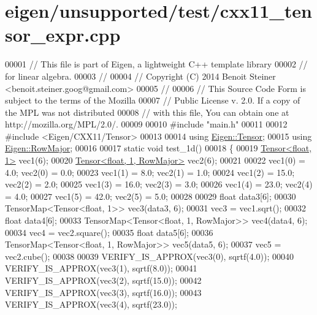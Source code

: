 \hypertarget{eigen_2unsupported_2test_2cxx11__tensor__expr_8cpp_source}{}\section{eigen/unsupported/test/cxx11\+\_\+tensor\+\_\+expr.cpp}
\label{eigen_2unsupported_2test_2cxx11__tensor__expr_8cpp_source}

\begin{DoxyCode}
00001 \textcolor{comment}{// This file is part of Eigen, a lightweight C++ template library}
00002 \textcolor{comment}{// for linear algebra.}
00003 \textcolor{comment}{//}
00004 \textcolor{comment}{// Copyright (C) 2014 Benoit Steiner <benoit.steiner.goog@gmail.com>}
00005 \textcolor{comment}{//}
00006 \textcolor{comment}{// This Source Code Form is subject to the terms of the Mozilla}
00007 \textcolor{comment}{// Public License v. 2.0. If a copy of the MPL was not distributed}
00008 \textcolor{comment}{// with this file, You can obtain one at http://mozilla.org/MPL/2.0/.}
00009 
00010 \textcolor{preprocessor}{#include "main.h"}
00011 
00012 \textcolor{preprocessor}{#include <Eigen/CXX11/Tensor>}
00013 
00014 \textcolor{keyword}{using} \hyperlink{class_eigen_1_1_tensor}{Eigen::Tensor};
00015 \textcolor{keyword}{using} \hyperlink{group__enums_ggaacded1a18ae58b0f554751f6cdf9eb13acfcde9cd8677c5f7caf6bd603666aae3}{Eigen::RowMajor};
00016 
00017 \textcolor{keyword}{static} \textcolor{keywordtype}{void} test\_1d()
00018 \{
00019   \hyperlink{class_eigen_1_1_tensor}{Tensor<float, 1>} vec1(6);
00020   \hyperlink{class_eigen_1_1_tensor}{Tensor<float, 1, RowMajor>} vec2(6);
00021 
00022   vec1(0) = 4.0;  vec2(0) = 0.0;
00023   vec1(1) = 8.0;  vec2(1) = 1.0;
00024   vec1(2) = 15.0; vec2(2) = 2.0;
00025   vec1(3) = 16.0; vec2(3) = 3.0;
00026   vec1(4) = 23.0; vec2(4) = 4.0;
00027   vec1(5) = 42.0; vec2(5) = 5.0;
00028 
00029   \textcolor{keywordtype}{float} data3[6];
00030   TensorMap<Tensor<float, 1>> vec3(data3, 6);
00031   vec3 = vec1.sqrt();
00032   \textcolor{keywordtype}{float} data4[6];
00033   TensorMap<Tensor<float, 1, RowMajor>> vec4(data4, 6);
00034   vec4 = vec2.square();
00035   \textcolor{keywordtype}{float} data5[6];
00036   TensorMap<Tensor<float, 1, RowMajor>> vec5(data5, 6);
00037   vec5 = vec2.cube();
00038 
00039   VERIFY\_IS\_APPROX(vec3(0), sqrtf(4.0));
00040   VERIFY\_IS\_APPROX(vec3(1), sqrtf(8.0));
00041   VERIFY\_IS\_APPROX(vec3(2), sqrtf(15.0));
00042   VERIFY\_IS\_APPROX(vec3(3), sqrtf(16.0));
00043   VERIFY\_IS\_APPROX(vec3(4), sqrtf(23.0));

\end{DoxyCode}

